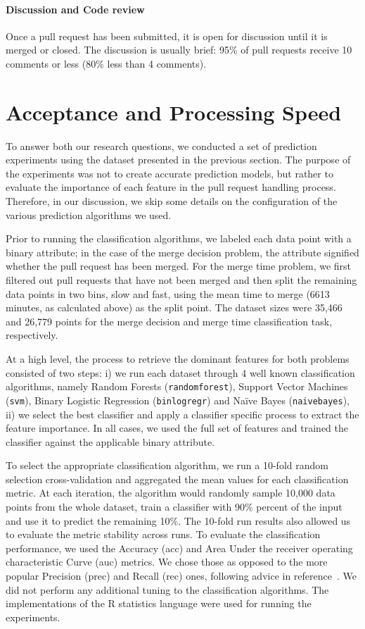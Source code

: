\documentclass{sig-alternate}
\begin{document}
\paragraph*{Discussion and Code review}

Once a pull request has been submitted, it is open for discussion until
it is merged or closed. The discussion is usually brief: 95\% of pull
requests receive 10 comments or less (80\% less than 4 comments). 


\section{Acceptance and Processing Speed}
\label{sec:accrej}

To answer both our research questions, we conducted a set of prediction
experiments using the dataset presented in the previous section.
The purpose of the experiments was not to create accurate prediction
models, but rather to evaluate the importance of each feature
in the pull request handling process. Therefore, in our discussion, 
we skip some details on the configuration of the various
prediction algorithms we used.

Prior to running the classification algorithms, we labeled each data point with
a binary attribute; in the case of the merge decision problem, the attribute
signified whether the pull request has been merged. For the merge time problem,
we first filtered out pull requests that have not been merged and then split
the remaining data points in two bins, slow and fast, using the mean time to
merge (6613 minutes, as calculated above) as the split point. The dataset
sizes were 35,466 and 26,779 points for the merge decision and merge time
classification task, respectively.

At a high level, the process to retrieve the dominant features for both
problems consisted of two steps: i) we run each dataset through 4 well known
classification algorithms, namely Random Forests (\texttt{randomforest}),
Support Vector Machines (\texttt{svm}), Binary Logistic Regression
(\texttt{binlogregr}) and Na\"ive Bayes (\texttt{naivebayes}), ii) we select
the best classifier and apply a classifier specific process to extract the
feature importance. In all cases, we used the full set of features and
trained the classifier against the applicable binary attribute.

To select the appropriate classification algorithm, we run a 10-fold random
selection cross-validation and aggregated the mean values for each
classification metric. At each iteration, the algorithm would randomly sample
10,000 data points from the whole dataset, train a classifier with 90\% percent
of the input and use it to predict the remaining 10\%. The 10-fold run results
also allowed us to evaluate the metric stability across runs. To evaluate the
classification performance, we used the Accuracy ({\sc acc}) and Area Under the
receiver operating characteristic Curve ({\sc auc}) metrics. We chose those as
opposed to the more popular Precision ({\sc prec}) and Recall ({\sc rec}) ones,
following advice in reference~\cite{Lessm08}. We did not perform any additional
tuning to the classification algorithms. The implementations of the R
statistics language were used for running the experiments.
\end{document}
